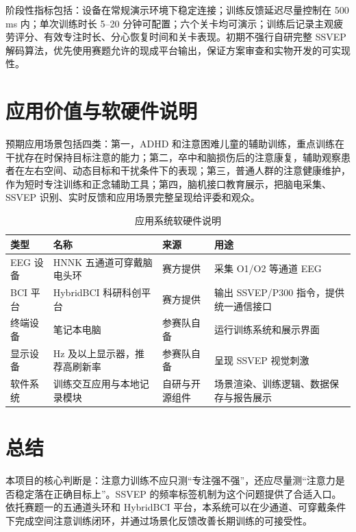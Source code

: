 \documentclass[UTF8,a4paper,zihao=5]{ctexart}
\begin{document}
阶段性指标包括：设备在常规演示环境下稳定连接；训练反馈延迟尽量控制在 500 ms 内；单次训练时长 5--20 分钟可配置；六个关卡均可演示；训练后记录主观疲劳评分、有效专注时长、分心恢复时间和关卡表现。初期不强行自研完整 SSVEP 解码算法，优先使用赛题允许的现成平台输出，保证方案审查和实物开发的可实现性。

\section{应用价值与软硬件说明}

预期应用场景包括四类：第一，ADHD 和注意困难儿童的辅助训练，重点训练在干扰存在时保持目标注意的能力；第二，卒中和脑损伤后的注意康复，辅助观察患者在左右空间、动态目标和干扰条件下的表现；第三，普通人群的注意健康维护，作为短时专注训练和正念辅助工具；第四，脑机接口教育展示，把脑电采集、SSVEP 识别、实时反馈和应用场景完整呈现给评委和观众。

\begin{table}[!htbp]
  \centering
  \caption{应用系统软硬件说明}
  \label{tab:hardware}
  \begin{tabularx}{\linewidth}{>{\raggedright\arraybackslash}p{2.1cm}>{\raggedright\arraybackslash}p{3.8cm}>{\raggedright\arraybackslash}p{2.2cm}>{\raggedright\arraybackslash}X}
    \toprule
    类型 & 名称 & 来源 & 用途 \\
    \midrule
    EEG 设备 & HNNK 五通道可穿戴脑电头环 & 赛方提供 & 采集 O1/O2 等通道 EEG \\
    BCI 平台 & HybridBCI 科研科创平台 & 赛方提供 & 输出 SSVEP/P300 指令，提供统一通信接口 \\
    终端设备 & 笔记本电脑 & 参赛队自备 & 运行训练系统和展示界面 \\
    显示设备 & 60 Hz 及以上显示器，推荐高刷新率 & 参赛队自备 & 呈现 SSVEP 视觉刺激 \\
    软件系统 & 训练交互应用与本地记录模块 & 自研与开源组件 & 场景渲染、训练逻辑、数据保存与报告展示 \\
    \bottomrule
  \end{tabularx}
\end{table}

\section{总结}

本项目的核心判断是：注意力训练不应只测“专注强不强”，还应尽量测“注意力是否稳定落在正确目标上”。SSVEP 的频率标签机制为这个问题提供了合适入口。依托赛题一的五通道头环和 HybridBCI 平台，本系统可以在少通道、可穿戴条件下完成空间注意训练闭环，并通过场景化反馈改善长期训练的可接受性。
\end{document}

